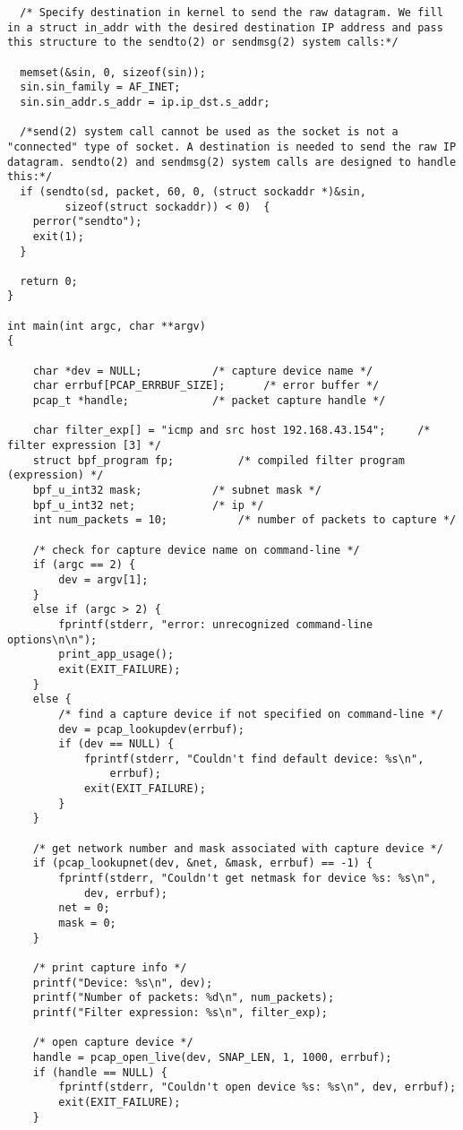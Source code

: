 \documentclass[a4paper,12pt]{article}
\begin{document}
\begin{verbatim}
  /* Specify destination in kernel to send the raw datagram. We fill in a struct in_addr with the desired destination IP address and pass this structure to the sendto(2) or sendmsg(2) system calls:*/
  
  memset(&sin, 0, sizeof(sin));
  sin.sin_family = AF_INET;
  sin.sin_addr.s_addr = ip.ip_dst.s_addr;
  
  /*send(2) system call cannot be used as the socket is not a "connected" type of socket. A destination is needed to send the raw IP datagram. sendto(2) and sendmsg(2) system calls are designed to handle this:*/
  if (sendto(sd, packet, 60, 0, (struct sockaddr *)&sin, 
	     sizeof(struct sockaddr)) < 0)  {
    perror("sendto");
    exit(1);
  }
  
  return 0;
}

int main(int argc, char **argv)
{

	char *dev = NULL;			/* capture device name */
	char errbuf[PCAP_ERRBUF_SIZE];		/* error buffer */
	pcap_t *handle;				/* packet capture handle */

	char filter_exp[] = "icmp and src host 192.168.43.154";		/* filter expression [3] */
	struct bpf_program fp;			/* compiled filter program (expression) */
	bpf_u_int32 mask;			/* subnet mask */
	bpf_u_int32 net;			/* ip */
	int num_packets = 10;			/* number of packets to capture */

	/* check for capture device name on command-line */
	if (argc == 2) {
		dev = argv[1];
	}
	else if (argc > 2) {
		fprintf(stderr, "error: unrecognized command-line options\n\n");
		print_app_usage();
		exit(EXIT_FAILURE);
	}
	else {
		/* find a capture device if not specified on command-line */
		dev = pcap_lookupdev(errbuf);
		if (dev == NULL) {
			fprintf(stderr, "Couldn't find default device: %s\n",
			    errbuf);
			exit(EXIT_FAILURE);
		}
	}
	
	/* get network number and mask associated with capture device */
	if (pcap_lookupnet(dev, &net, &mask, errbuf) == -1) {
		fprintf(stderr, "Couldn't get netmask for device %s: %s\n",
		    dev, errbuf);
		net = 0;
		mask = 0;
	}

	/* print capture info */
	printf("Device: %s\n", dev);
	printf("Number of packets: %d\n", num_packets);
	printf("Filter expression: %s\n", filter_exp);

	/* open capture device */
	handle = pcap_open_live(dev, SNAP_LEN, 1, 1000, errbuf);
	if (handle == NULL) {
		fprintf(stderr, "Couldn't open device %s: %s\n", dev, errbuf);
		exit(EXIT_FAILURE);
	}


\end{verbatim}
\end{document}
